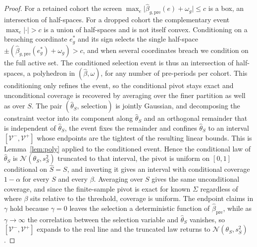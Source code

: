 \documentclass[12pt]{article}
\theoremstyle{remark}
\begin{document}
\begin{proof}
For a retained cohort the screen $\max_e\lvert\hat\beta_{g,\mathrm{pre}}(e)+\omega_g\rvert\le c$ is a box, an
intersection of half-spaces. For a dropped cohort the complementary event $\max_e\lvert\cdot\rvert>c$ is a
union of half-spaces and is not itself convex. Conditioning on a breaching coordinate $e_g^\ast$ and its
sign selects the single half-space $\pm(\hat\beta_{g,\mathrm{pre}}(e_g^\ast)+\omega_g)>c$, and when several
coordinates breach we condition on the full active set. The conditioned selection event is thus an intersection
of half-spaces, a polyhedron in $(\hat\beta,\omega)$, for any number of pre-periods per cohort. This
conditioning only refines the event, so the conditional pivot stays exact and unconditional coverage is
recovered by averaging over the finer partition as well as over $S$. The
pair $(\hat\theta_S,\,\text{selection})$ is jointly Gaussian, and decomposing the constraint vector into
its component along $\hat\theta_S$ and an orthogonal remainder that is independent of $\hat\theta_S$, the
event fixes the remainder and confines $\hat\theta_S$ to an interval $[\mathcal V^-,\mathcal V^+]$ whose
endpoints are the tightest of the resulting linear bounds. This is Lemma~\ref{lem:poly} applied to the
conditioned event. Hence the conditional law of $\hat\theta_S$ is $\mathcal N(\theta_S,s_S^2)$ truncated to
that interval, the pivot is uniform on $[0,1]$ conditional on $\hat S=S$, and inverting it gives an
interval with conditional coverage $1-\alpha$ for every $S$ and every $\beta$. Averaging over $S$ gives
the same unconditional coverage, and since the finite-sample pivot is exact for known $\Sigma$ regardless
of where $\beta$ sits relative to the threshold, coverage is uniform. The endpoint claims in $\gamma$ hold
because $\gamma=0$ leaves the selection a deterministic function of $\hat\beta_{\mathrm{pre}}$, while as
$\gamma\to\infty$ the correlation between the selection variable and $\hat\theta_S$ vanishes, so
$[\mathcal V^-,\mathcal V^+]$ expands to the real line and the truncated law returns to
$\mathcal N(\theta_S,s_S^2)$.
\end{proof}
\end{document}
